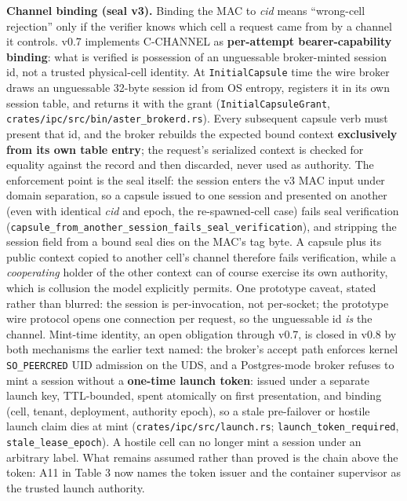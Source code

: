 \documentclass[
  11pt,
]{article}
\begin{document}
\textbf{Channel binding (seal v3).} Binding the MAC to \emph{cid} means ``wrong-cell rejection'' only if the verifier knows which cell a request came from by a channel it controls. v0.7 implements C-CHANNEL as \textbf{per-attempt bearer-capability binding}: what is verified is possession of an unguessable broker-minted session id, not a trusted physical-cell identity. At \texttt{InitialCapsule} time the wire broker draws an unguessable 32-byte session id from OS entropy, registers it in its own session table, and returns it with the grant (\texttt{InitialCapsuleGrant}, \texttt{crates/ipc/src/bin/aster\_brokerd.rs}). Every subsequent capsule verb must present that id, and the broker rebuilds the expected bound context \textbf{exclusively from its own table entry}; the request's serialized context is checked for equality against the record and then discarded, never used as authority. The enforcement point is the seal itself: the session enters the v3 MAC input under domain separation, so a capsule issued to one session and presented on another (even with identical \emph{cid} and epoch, the re-spawned-cell case) fails seal verification (\texttt{capsule\_from\_another\_session\_fails\_seal\_verification}), and stripping the session field from a bound seal dies on the MAC's tag byte. A capsule plus its public context copied to another cell's channel therefore fails verification, while a \emph{cooperating} holder of the other context can of course exercise its own authority, which is collusion the model explicitly permits. One prototype caveat, stated rather than blurred: the session is per-invocation, not per-socket; the prototype wire protocol opens one connection per request, so the unguessable id \emph{is} the channel. Mint-time identity, an open obligation through v0.7, is closed in v0.8 by both mechanisms the earlier text named: the broker's accept path enforces kernel \texttt{SO\_PEERCRED} UID admission on the UDS, and a Postgres-mode broker refuses to mint a session without a \textbf{one-time launch token}: issued under a separate launch key, TTL-bounded, spent atomically on first presentation, and binding (cell, tenant, deployment, authority epoch), so a stale pre-failover or hostile launch claim dies at mint (\texttt{crates/ipc/src/launch.rs}; \texttt{launch\_token\_required}, \texttt{stale\_lease\_epoch}). A hostile cell can no longer mint a session under an arbitrary label. What remains assumed rather than proved is the chain above the token: A11 in Table 3 now names the token issuer and the container supervisor as the trusted launch authority.
\end{document}
